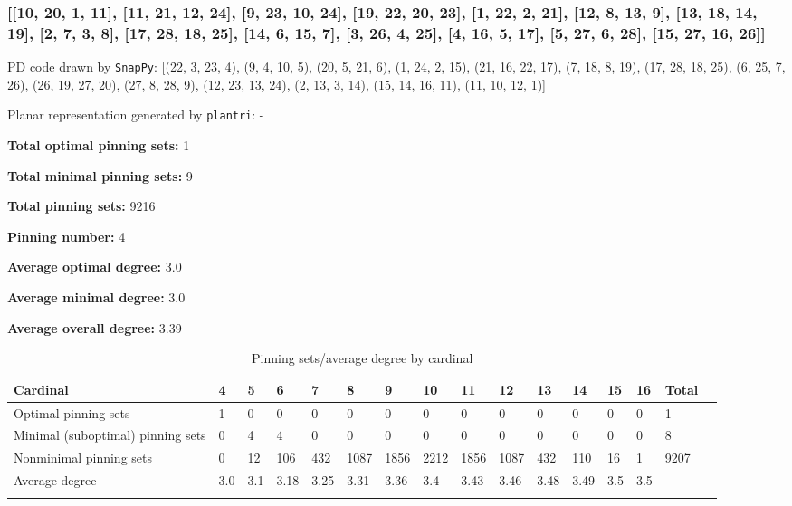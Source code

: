 \documentclass{article}%
\begin{document}
\newpage

\subsubsection{[[10, 20, 1, 11], [11, 21, 12, 24], [9, 23, 10, 24], [19, 22, 20, 23], [1, 22, 2, 21], [12, 8, 13, 9], [13, 18, 14, 19], [2, 7, 3, 8], [17, 28, 18, 25], [14, 6, 15, 7], [3, 26, 4, 25], [4, 16, 5, 17], [5, 27, 6, 28], [15, 27, 16, 26]]}

{\small\noindent PD code drawn by \texttt{SnapPy}: [(22, 3, 23, 4), (9, 4, 10, 5), (20, 5, 21, 6), (1, 24, 2, 15), (21, 16, 22, 17), (7, 18, 8, 19), (17, 28, 18, 25), (6, 25, 7, 26), (26, 19, 27, 20), (27, 8, 28, 9), (12, 23, 13, 24), (2, 13, 3, 14), (15, 14, 16, 11), (11, 10, 12, 1)]}

{\small\noindent Planar representation generated by \texttt{plantri}: -}

\begin{multicols}{2}
{\normalsize \noindent\textbf{Total optimal pinning sets:} 1

\noindent\textbf{Total minimal pinning sets:} 9

\noindent\textbf{Total pinning sets:} 9216

\noindent\textbf{Pinning number:} 4

}
\columnbreak

{\normalsize \noindent\textbf{Average optimal degree:} 3.0

\noindent\textbf{Average minimal degree:} 3.0

\noindent\textbf{Average overall degree:} 3.39

}
\end{multicols}

\begin{table}[ht]
	\caption{Pinning sets/average degree by cardinal}
	\centering
	\renewcommand{\arraystretch}{1.5}
	\begin{tabularx}{\textwidth}{lXXXXXXXXXXXXXXX}
		\toprule
			Cardinal & 4 & 5 & 6 & 7 & 8 & 9 & 10 & 11 & 12 & 13 & 14 & 15 & 16 & Total\\
			\hline
			Optimal pinning sets & 1 & 0 & 0 & 0 & 0 & 0 & 0 & 0 & 0 & 0 & 0 & 0 & 0 & 1 \\
			Minimal (suboptimal) pinning sets & 0 & 4 & 4 & 0 & 0 & 0 & 0 & 0 & 0 & 0 & 0 & 0 & 0 & 8 \\
			Nonminimal pinning sets & 0 & 12 & 106 & 432 & 1087 & 1856 & 2212 & 1856 & 1087 & 432 & 110 & 16 & 1 & 9207 \\
			Average degree & 3.0 & 3.1 & 3.18 & 3.25 & 3.31 & 3.36 & 3.4 & 3.43 & 3.46 & 3.48 & 3.49 & 3.5 & 3.5 &  \\
		\bottomrule \\ 
	\end{tabularx}
\end{table}
\end{document}
